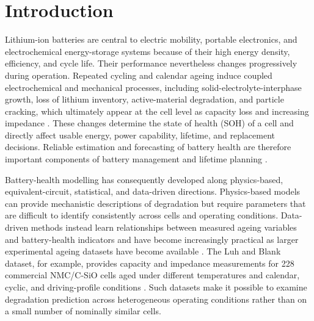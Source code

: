 \documentclass[a4paper,fleqn]{cas-sc}
\begin{document}
\maketitle

\linenumbers

\section{Introduction}
\label{sec:introduction}

Lithium-ion batteries are central to electric mobility, portable electronics, and electrochemical energy-storage systems because of their high energy density, efficiency, and cycle life. Their performance nevertheless changes progressively during operation. Repeated cycling and calendar ageing induce coupled electrochemical and mechanical processes, including solid-electrolyte-interphase growth, loss of lithium inventory, active-material degradation, and particle cracking, which ultimately appear at the cell level as capacity loss and increasing impedance \cite{edge2021degradation}. These changes determine the state of health (SOH) of a cell and directly affect usable energy, power capability, lifetime, and replacement decisions. Reliable estimation and forecasting of battery health are therefore important components of battery management and lifetime planning \cite{ng2020battery}.

Battery-health modelling has consequently developed along physics-based, equivalent-circuit, statistical, and data-driven directions. Physics-based models can provide mechanistic descriptions of degradation but require parameters that are difficult to identify consistently across cells and operating conditions. Data-driven methods instead learn relationships between measured ageing variables and battery-health indicators and have become increasingly practical as larger experimental ageing datasets have become available \cite{ng2020battery,luh2024dataset}. The Luh and Blank dataset, for example, provides capacity and impedance measurements for 228 commercial NMC/C-SiO cells aged under different temperatures and calendar, cyclic, and driving-profile conditions \cite{luh2024dataset}. Such datasets make it possible to examine degradation prediction across heterogeneous operating conditions rather than on a small number of nominally similar cells.
\end{document}

